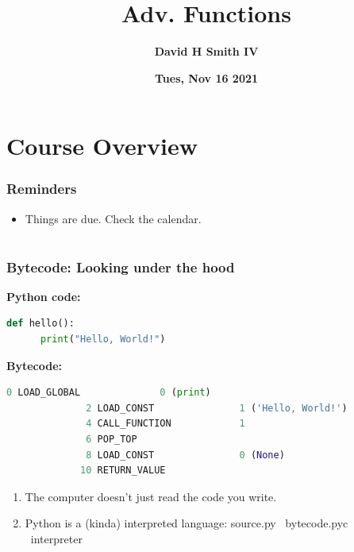 \documentclass{beamer}
\title{\textbf{Adv. Functions}}
\author{\textbf{David H Smith IV}}
\institute[\textbf{UIUC}]{\textbf{University of Illinois Urbana-Champaign}}
\date{\textbf{Tues, Nov 16 2021}}
\begin{document}
\frame{\titlepage}

\section{Course Overview}

%
%
\begin{frame}
  \frametitle{Reminders}
  \begin{itemize}
    \item Things are due. Check the calendar.
  \end{itemize}
\end{frame}

\section{}

%
%
\begin{frame}[fragile]
  \frametitle{Bytecode: Looking under the hood}
  \textbf{Python code:}\\
  \begin{lstlisting}[language=Python, autogobble]
  def hello():
      print("Hello, World!")
  \end{lstlisting}
  \vfill
  \textbf{Bytecode:}\\
  \begin{lstlisting}[language=Python, autogobble]
              0 LOAD_GLOBAL              0 (print)
              2 LOAD_CONST               1 ('Hello, World!')
              4 CALL_FUNCTION            1
              6 POP_TOP
              8 LOAD_CONST               0 (None)
             10 RETURN_VALUE
  \end{lstlisting}
  \vfill
  \begin{enumerate}[A]
    \item The computer doesn't just read the code you write.
      \pause
    \item Python is a (kinda) interpreted language: source.py \textrightarrow \ bytecode.pyc \textrightarrow \ interpreter
      \pause
  \end{enumerate}
\end{frame}
\end{document}
